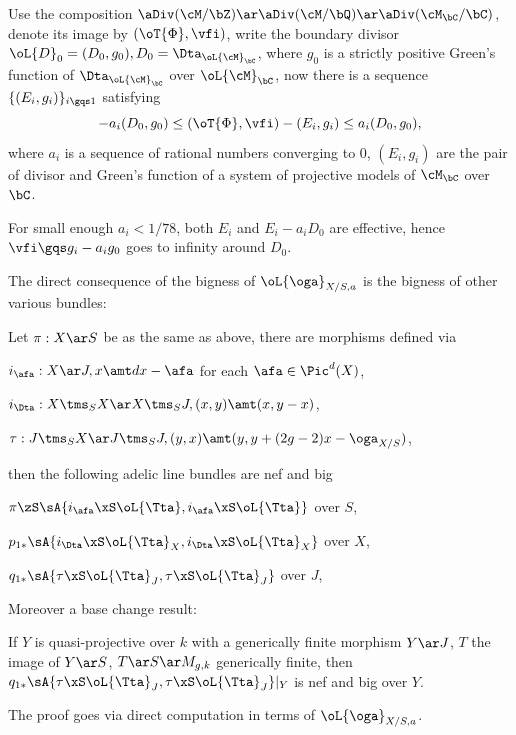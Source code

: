\documentclass[a4paper, twoside]{article}
\begin{document}
\begin{prf}
	Use the composition $\aDiv(\cM/\bZ)\ar\aDiv(\cM/\bQ)\ar\aDiv(\cM_{\bC}/\bC)$, denote its image by $(\oT{\Phi},\vfi)$, write the boundary divisor $\oL{D}_{0}=(D_{0},g_{0}), D_{0}=\Dta_{\oL{\cM}_{\bC}}$, where $g_{0}$ is a strictly positive Green's function of $\Dta_{\oL{\cM}_{\bC}}$ over $\oL{\cM}_{\bC}$, now there is a sequence $\{(E_{i},g_{i})\}_{i\gqs1}$ satisfying
	\[
		-a_{i}(D_{0},g_{0})\leq(\oT{\Phi},\vfi)-(E_{i},g_{i})\leq a_{i}(D_{0},g_{0}),
	\]
	where $a_{i}$ is a sequence of rational numbers converging to $0$, $(E_{i},g_{i})$ are the pair of divisor and Green's function of a system of projective models of $\cM_{\bC}$ over $\bC$.

	For small enough $a_{i}<1/78$, both $E_{i}$ and $E_{i}-a_{i}D_{0}$ are effective, hence $\vfi\gqs g_{i}-a_{i}g_{0}$ goes to infinity around $D_{0}$.
\end{prf}


The direct consequence of the bigness of $\oL{\oga}_{X/S,a}$ is the bigness of other various bundles:

\begin{thm}[Theorem~4.4]
	Let $\pi:X\ar S$ be as the same as above, there are morphisms defined via
	\begin{enr}
		\item $i_{\afa}:X\ar J, x\amt dx-\afa$ for each $\afa\in\Pic^{d}(X)$,
		\item $i_{\Dta}:X\tms_{S}X\ar X\tms_{S}J, (x,y)\amt (x,y-x)$,
		\item $\tau:J\tms_{S}X\ar J\tms_{S}J, (y,x)\amt(y,y+(2g-2)x-\oga_{X/S})$,
	\end{enr}
	then the following adelic line bundles are nef and big
	\begin{enr}
		\item $\pi\zS\sA{i_{\afa}\xS\oL{\Tta},i_{\afa}\xS\oL{\Tta}}$ over $S$,
		\item $p_{1*}\sA{i_{\Dta}\xS\oL{\Tta}_{X},i_{\Dta}\xS\oL{\Tta}_{X}}$ over $X$,
		\item $q_{1*}\sA{\tau\xS\oL{\Tta}_{J},\tau\xS\oL{\Tta}_{J}}$ over $J$,
	\end{enr}
	Moreover a base change result:

	If $Y$ is quasi-projective over $k$ with a generically finite morphism $Y\ar J$, $T$ the image of $Y\ar S$, $T\ar S\ar M_{g,k}$ generically finite, then $q_{1*}\sA{\tau\xS\oL{\Tta}_{J},\tau\xS\oL{\Tta}_{J}}|_{Y}$ is nef and big over $Y$.
\end{thm}
\begin{rmk}
	The proof goes via direct computation in terms of $\oL{\oga}_{X/S,a}$.
\end{rmk}
\end{document}
